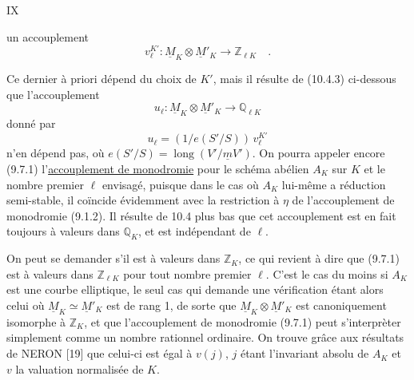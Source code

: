 \hfill IX

un accouplement
\[
 v_\ell^{K'}:\underline M_K\otimes\underline M'_K\longrightarrow\mathbb Z_{\ell K}\quad.\tag*{(*)}
\]

Ce dernier à priori dépend du choix de $K'$, mais il résulte de (10.4.3) ci-dessous que l'accouplement
\[
 u_\ell:\underline M_K\otimes\underline M'_K\longrightarrow\mathbb Q_{\ell K}\tag*{(9.7.1)}
\]
donné par
\[
 u_\ell=(1/e(S'/S))\,v_\ell^{K'}
\]
n'en dépend pas, où $e(S'/S)=\operatorname{long}(V'/\underline m V')$. On pourra appeler encore (9.7.1) l'\uline{accouplement de monodromie} pour le schéma abélien $A_K$ sur $K$ et le nombre premier $\ell$ envisagé, puisque dans le cas où $A_K$ lui-même a réduction semi-stable, il coïncide évidemment avec la restriction à $\eta$ de l'accouplement de monodromie (9.1.2). Il résulte de 10.4 plus bas que cet accouplement est en fait toujours à valeurs dans $\mathbb Q_K$, et est indépendant de $\ell$.

On peut se demander s'il est à valeurs dans $\mathbb Z_K$, ce qui revient à dire que (9.7.1) est à valeurs dans $\mathbb Z_{\ell K}$ pour tout nombre premier $\ell$. C'est le cas du moins si $A_K$ est une courbe elliptique, le seul cas qui demande une vérification étant alors celui où $\underline M_K\simeq\underline M'_K$ est de rang 1, de sorte que $\underline M_K\otimes\underline M'_K$ est canoniquement isomorphe à $\mathbb Z_K$, et que l'accouplement de monodromie (9.7.1) peut s'interprèter simplement comme un nombre rationnel ordinaire. On trouve grâce aux résultats de NERON [19] que celui-ci est égal à $v(j)$, $j$ étant l'invariant absolu de $A_K$ et $v$ la valuation normalisée de $K$.

